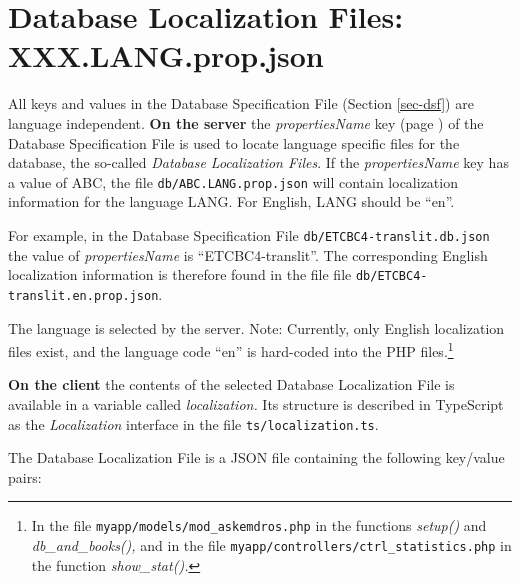 \documentclass[11pt,oneside,a4paper]{memoir}
\begin{document}
\section{Database Localization Files: XXX.LANG.prop.json}\label{db-local}

All keys and values in the Database Specification File (Section \ref{sec-dsf}) are language
independent. \textbf{On the server} the \emph{propertiesName} key (page \pageref{propname}) of the
Database Specification File is used to locate language specific files for the database, the
so-called \emph{Database Localization Files}. If the \emph{propertiesName} key has a value of ABC,
the file \texttt{db/ABC.LANG.prop.json} will contain localization information for the language LANG.
For English, LANG should be ``en''.

For example, in the Database Specification File \texttt{db/ETCBC4-translit.db.json} the value of
\emph{propertiesName} is ``ETCBC4-translit''. The corresponding English localization information is
therefore found in the file file \texttt{db/ETCBC4-translit.en.prop.json}.

The language is selected by the server. Note: Currently, only English localization files exist, and
the language code ``en'' is hard-coded into the PHP files.\footnote{In the file
  \texttt{myapp/models/mod\_askemdros.php} in the functions \emph{setup()} and
  \emph{db\_and\_books(),} and in the file \texttt{myapp/controllers/ctrl\_statistics.php} in the
  function \emph{show\_stat().}}

\textbf{On the client} the contents of the selected Database Localization File is available in a
variable called \emph{localization.} Its structure is described in TypeScript as the
\emph{Localization} interface in the file \texttt{ts/localization.ts}.

The Database Localization File is a JSON file containing the following key/value pairs:
\end{document}
